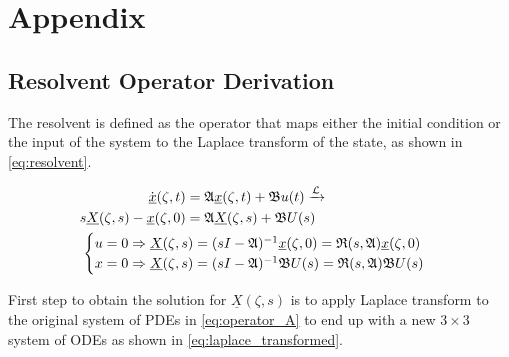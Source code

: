 \section*{Appendix}

\subsection{Resolvent Operator Derivation} \label{app:resolvent}

The resolvent is defined as the operator that maps either the initial condition or the input of the system to the Laplace transform of the state, as shown in \eqref{eq:resolvent}.

\begin{equation} \label{eq:resolvent}
\begin{aligned}
    \dot{\underline{x}}(\zeta, t) &= \mathfrak{A} \underline{x}(\zeta, t) + \mathfrak{B} u(t) \xrightarrow{\mathcal{L}}\\
    s \underline{X}(\zeta,s) - \underline{x}(\zeta,0) &= \mathfrak{A} \underline{X}(\zeta,s) + \mathfrak{B} U(s)\\
    &\hspace{-7.5em}\begin{cases}
        u = 0 \Rightarrow \underline{X}(\zeta,s) = (sI - \mathfrak{A})^{-1} \underline{x}(\zeta,0) = \mathfrak{R}(s, \mathfrak{A}) \underline{x}(\zeta,0)\\
        x = 0 \Rightarrow \underline{X}(\zeta,s) = (sI - \mathfrak{A})^{-1} \mathfrak{B} U(s) = \mathfrak{R}(s, \mathfrak{A}) \mathfrak{B} U(s)
    \end{cases}
\end{aligned}
\end{equation}

First step to obtain the solution for $\underline{X}(\zeta, s)$ is to apply Laplace transform to the original system of PDEs in \eqref{eq:operator_A} to end up with a new $3 \times 3$ system of ODEs as shown in \eqref{eq:laplace_transformed}.

